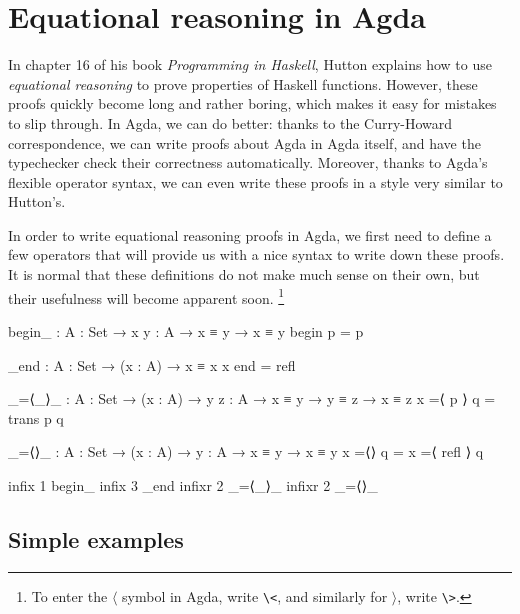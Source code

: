 \documentclass[a4paper,UKenglish]{tufte-handout}
\theoremstyle{definition}
\begin{document}
\section{Equational reasoning in Agda}

In chapter 16 of his book \emph{Programming in Haskell}, Hutton
explains how to use \emph{equational reasoning} to prove properties of
Haskell functions. However, these proofs quickly become long and
rather boring, which makes it easy for mistakes to slip through. In
Agda, we can do better: thanks to the Curry-Howard correspondence, we
can write proofs about Agda in Agda itself, and have the typechecker
check their correctness automatically. Moreover, thanks to Agda's
flexible operator syntax, we can even write these proofs in a style
very similar to Hutton's.

In order to write equational reasoning proofs in Agda, we first need
to define a few operators that will provide us with a nice syntax to
write down these proofs. It is normal that these definitions do not
make much sense on their own, but their usefulness will become
apparent soon.%
\footnote{To enter the $⟨$ symbol in Agda, write
\texttt{\textbackslash{}<}, and similarly for $\rangle$, write
\texttt{\textbackslash{}>}.}
\begin{code}[number]
begin_ : {A : Set} → {x y : A} → x ≡ y → x ≡ y
begin p = p

_end : {A : Set} → (x : A) → x ≡ x
x end = refl

_=⟨_⟩_ : {A : Set} → (x : A) → {y z : A}
       → x ≡ y → y ≡ z → x ≡ z
x =⟨ p ⟩ q = trans p q

_=⟨⟩_ : {A : Set} → (x : A) → {y : A} → x ≡ y → x ≡ y
x =⟨⟩ q = x =⟨ refl ⟩ q

infix   1  begin_
infix   3  _end
infixr  2  _=⟨_⟩_
infixr  2  _=⟨⟩_
\end{code}

\subsection{Simple examples}
\end{document}
